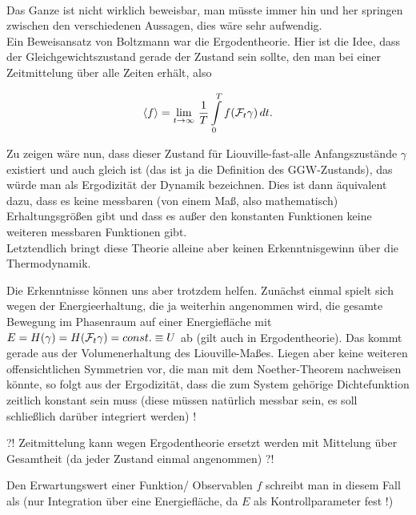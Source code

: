 \documentclass[../KlassMech_main.tex]{subfiles}
\begin{document}
	\\

Das Ganze ist nicht wirklich beweisbar, man müsste immer hin und her springen zwischen den verschiedenen Aussagen, dies wäre sehr aufwendig.\\
Ein Beweisansatz von Boltzmann war die Ergodentheorie. Hier ist die Idee, dass der Gleichgewichtszustand gerade der Zustand sein sollte, den man bei einer Zeitmittelung über alle Zeiten erhält, also

\begin{equation}\label{eq:ergod}
\expval{f} = \lim_{t \rightarrow \infty} \, \frac{1}{T} \int\limits_0^T f\qty(\mathcal{F}_t \gamma) \, dt .
\end{equation}

Zu zeigen wäre nun, dass dieser Zustand für Liouville-fast-alle Anfangszustände $\gamma$ existiert und auch gleich ist (das ist ja die Definition des GGW-Zustands), das würde man als Ergodizität der Dynamik bezeichnen. Dies ist dann äquivalent dazu, dass es keine messbaren (von einem Maß, also mathematisch) Erhaltungsgrößen gibt und dass es außer den konstanten Funktionen keine weiteren messbaren Funktionen gibt.\\
Letztendlich bringt diese Theorie alleine aber keinen Erkenntnisgewinn über die Thermodynamik.

Die Erkenntnisse können uns aber trotzdem helfen. Zunächst einmal spielt sich wegen der Energieerhaltung, die ja weiterhin angenommen wird, die gesamte Bewegung im Phasenraum auf einer Energiefläche mit $E = H\qty(\gamma) = H\qty(\mathcal{F}_t \gamma) = const. \equiv U$ ab (gilt auch in Ergodentheorie). Das kommt gerade aus der Volumenerhaltung des Liouville-Maßes. Liegen aber keine weiteren offensichtlichen Symmetrien vor, die man mit dem Noether-Theorem nachweisen könnte, so folgt aus der Ergodizität, dass die zum System gehörige Dichtefunktion zeitlich konstant sein muss (diese müssen natürlich messbar sein, es soll schließlich darüber integriert werden) !

?! Zeitmittelung kann wegen Ergodentheorie ersetzt werden mit Mittelung über Gesamtheit (da jeder Zustand einmal angenommen) ?!

Den Erwartungswert einer Funktion/ Observablen $f$ schreibt man in diesem Fall als (nur Integration über eine Energiefläche, da $E$ als Kontrollparameter fest !)
\end{document}
